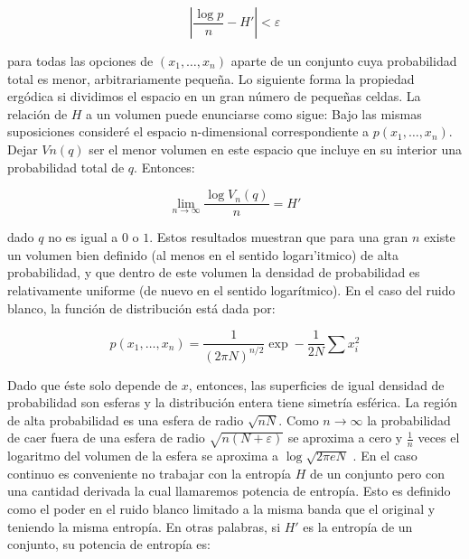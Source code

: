 \begin{equation}
\left | \frac{\log p}{n} - {H}'\right |< \varepsilon 
\end{equation}

para todas las opciones de $\left ( x_{1},\dots ,x_{n} \right )$ aparte de un conjunto cuya probabilidad total es menor, arbitrariamente peque\~na. Lo siguiente forma la propiedad erg\'odica si dividimos el espacio en un gran n\'umero de peque\~nas celdas. La relaci\'on de $H$ a un volumen puede enunciarse como sigue: Bajo las mismas suposiciones consider\'e el espacio n-dimensional correspondiente a $p\left ( x_{1},\dots ,x_{n} \right )$. Dejar $Vn\left ( 	q \right )$ ser el menor volumen en este espacio que incluye en su interior una probabilidad total de $q$. Entonces:

\begin{equation}
\lim_{n\rightarrow \infty }\frac{\log V_{n}\left ( q \right )}{n}={H}'
\end{equation}

dado $q$ no es igual a $0$ o $1$.\newline
Estos resultados muestran que para una gran $n$ existe un volumen bien definido (al menos en el sentido logar\i'itmico) de alta probabilidad, y que dentro de este volumen la densidad de probabilidad es relativamente uniforme (de nuevo en el sentido logar\'itmico).\newline
En el caso del ruido blanco, la funci\'on de distribuci\'on est\'a dada por:

\begin{equation}
p\left ( x_{1}, \ldots ,x_{n}\right )=\frac{1}{\left ( 2\pi N \right )^{n/2}}\exp -\frac{1}{2N}\sum x_{i}^{2}
\end{equation}

Dado que \'este solo depende de $x$, entonces, las superficies de igual densidad de probabilidad son esferas y la distribuci\'on entera tiene simetr\'ia esf\'erica. La regi\'on de alta probabilidad es una esfera de radio $\sqrt{nN}$. Como $n\rightarrow \infty $ la probabilidad de caer fuera de una esfera de radio $\sqrt{n\left ( N+\varepsilon  \right )}$ se aproxima a cero y $\frac{1}{n}$ veces el logaritmo del volumen de la esfera se aproxima a $\log \sqrt{2\pi eN}$ .
En el caso continuo es conveniente no trabajar con la entrop\'ia $H$ de un conjunto pero con una cantidad derivada la cual llamaremos potencia de entrop\'ia. Esto es definido como el poder en el ruido blanco limitado a la misma banda que el original y teniendo la misma entrop\'ia. En otras palabras, si ${H}'$ es la entrop\'ia de un conjunto, su potencia de entrop\'ia es:

